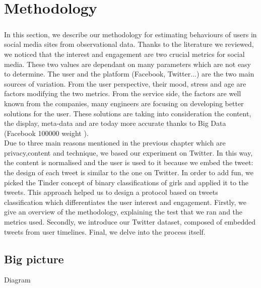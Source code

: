 \chapter{Methodology}

\paragraph{}
In this section, we describe our methodology for estimating behaviours of users in social media sites from observational data. Thanks to the literature we reviewed, we noticed that the interest and engagement are two crucial metrics for social media. These two values are dependant on many parameters which are not easy to determine. The user and the platform (Facebook, Twitter...) are the two main sources of variation. From the user perspective, their mood, stress and age \cite{f_youth_engagement} are factors modifying the two metrics. From the service side, the factors are well known from the companies, many engineers are focusing on developing better solutions for the user. These solutions are taking into consideration the content, the display, meta-data and are today more accurate thanks to Big Data (Facebook 100000 weight \cite{f_EdgeRank2}).\\
Due to three main reasons mentioned in the previous chapter which are privacy,content and technique, we based our experiment on Twitter. In this way, the content is normalised and the user is used to it because we embed the tweet: the design of each tweet is similar to the one on Twitter. In order to add fun, we picked the Tinder concept of binary classifications of girls and applied it to the tweets. This approach helped us to design a protocol based on tweets classification which differentiates the user interest and engagement.
Firstly, we give an overview of the methodology, explaining the test that we ran and the metrics used. Secondly, we introduce our Twitter dataset, composed of embedded tweets from user timelines. Final, we delve into the process itself.

\section{Big picture}

Diagram

